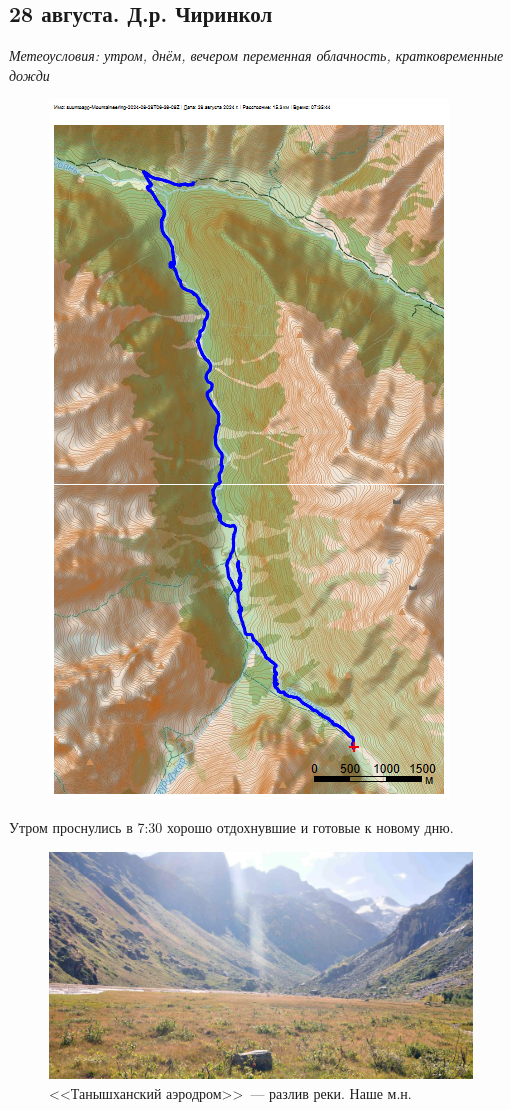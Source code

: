 \subsection{28 августа. Д.р. Чиринкол}

\textit{Метеоусловия: утром, днём, вечером переменная облачность, кратковременные дожди}

\begin{figure}[h!]
	\centering
	\includegraphics[angle=0, width=0.7\linewidth]{../pics/mini_maps/28}
	\label{fig:mini_28}
\end{figure}

Утром проснулись в 7:30 хорошо отдохнувшие и готовые к новому дню.

\begin{figure}[h!]
	\centering
	\includegraphics[width=0.7\linewidth]{../pics/DSC_0434 2.jpg}
	\caption{<<Танышханский аэродром>>~--- разлив реки. Наше м.н.}
	\label{fig:DSC_0434}
\end{figure}

